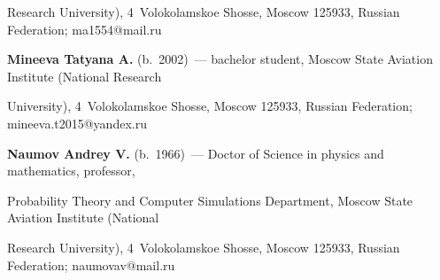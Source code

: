 Research University), 4~Volokolamskoe Shosse, Moscow 125933, Russian Federation; \mbox{ma1554@mail.ru}





\vspace*{2pt}





\noindent


\textbf{Mineeva Tatyana A.} (b.\ 2002)~--- bachelor student, Moscow State Aviation Institute (National Research 


University), 4~Volokolamskoe Shosse, Moscow 125933, Russian Federation; \mbox{mineeva.t2015@yandex.ru}





\vspace*{2pt}





\noindent


\textbf{Naumov Andrey V.} (b.\ 1966)~--- Doctor of Science in physics and mathematics, professor, 


Probability Theory and Computer Simulations Department, Moscow State Aviation Institute (National 


Research University), 4~Volokolamskoe Shosse, Moscow 125933, Russian Federation; \mbox{naumovav@mail.ru}








\label{end\stat}





\renewcommand{\bibname}{\protect\rm Литература} 


\renewcommand{\figurename}{\protect\bf Рис.}


\renewcommand{\tablename}{\protect\bf Таблица}


